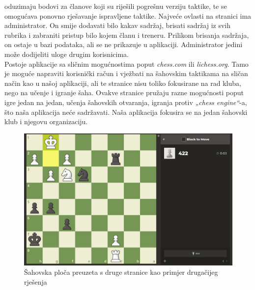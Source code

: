 			oduzimaju bodovi za članove koji su riješili pogrešnu verziju taktike,
			te se omogućava ponovno rješavanje ispravljene taktike. Najveće ovlasti
			na stranici ima administrator. On smije dodavati bilo kakav sadržaj,
			brisati sadržaj iz svih rubrika i zabraniti pristup bilo kojem članu i
			treneru. Prilikom brisanja sadržaja, on ostaje u bazi podataka, ali se
			ne prikazuje u aplikaciji. Administrator jedini može dodijeliti uloge
			drugim korisnicima. \\
			Postoje aplikacije sa sličnim mogućnostima poput \textit{chess.com} ili \textit{lichess.org}. Tamo
			je moguće napraviti korisnički račun i vježbati na šahovskim taktikama
			na sličan način kao u našoj aplikaciji, ali te stranice nisu toliko
			fokusirane na rad kluba, nego na učenje i igranje šaha. Ovakve stranice
			pružaju razne mogućnosti poput igre jedan na jedan, učenja šahovskih
			otvaranja, igranja protiv \textit{„chess engine``}-a, što naša aplikacija neće
			sadržavati. Naša aplikacija fokusira se na jedan šahovski klub i njegovu
			organizaciju. \\
			
				\begin{figure}[H]
				\centering
				\includegraphics[scale=0.3]{slike/sah-slicno rjesenje.jpeg} %
				\caption{Šahovska ploča preuzeta s druge stranice kao primjer drugačijeg rješenja}
				\label{fig:UC$<$broj obrasca$>$}
			\end{figure}
		
